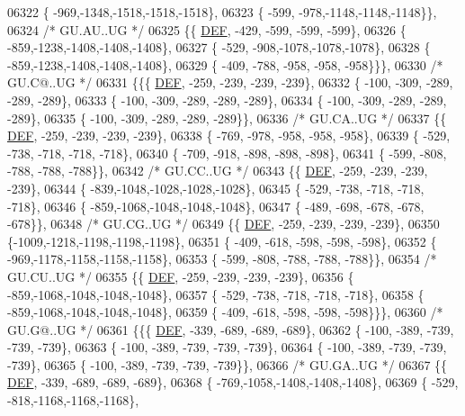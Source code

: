 \begin{DoxyCode}
06322 \{ -969,-1348,-1518,-1518,-1518\},
06323 \{ -599, -978,-1148,-1148,-1148\}\},
06324 \textcolor{comment}{/* GU.AU..UG */}
06325 \{\{  \mbox{\hyperlink{1_88_84__epars_8h_a397419fc12b37ed479c8abb9d444d843}{DEF}}, -429, -599, -599, -599\},
06326 \{ -859,-1238,-1408,-1408,-1408\},
06327 \{ -529, -908,-1078,-1078,-1078\},
06328 \{ -859,-1238,-1408,-1408,-1408\},
06329 \{ -409, -788, -958, -958, -958\}\}\},
06330 \textcolor{comment}{/* GU.C@..UG */}
06331 \{\{\{  \mbox{\hyperlink{1_88_84__epars_8h_a397419fc12b37ed479c8abb9d444d843}{DEF}}, -259, -239, -239, -239\},
06332 \{ -100, -309, -289, -289, -289\},
06333 \{ -100, -309, -289, -289, -289\},
06334 \{ -100, -309, -289, -289, -289\},
06335 \{ -100, -309, -289, -289, -289\}\},
06336 \textcolor{comment}{/* GU.CA..UG */}
06337 \{\{  \mbox{\hyperlink{1_88_84__epars_8h_a397419fc12b37ed479c8abb9d444d843}{DEF}}, -259, -239, -239, -239\},
06338 \{ -769, -978, -958, -958, -958\},
06339 \{ -529, -738, -718, -718, -718\},
06340 \{ -709, -918, -898, -898, -898\},
06341 \{ -599, -808, -788, -788, -788\}\},
06342 \textcolor{comment}{/* GU.CC..UG */}
06343 \{\{  \mbox{\hyperlink{1_88_84__epars_8h_a397419fc12b37ed479c8abb9d444d843}{DEF}}, -259, -239, -239, -239\},
06344 \{ -839,-1048,-1028,-1028,-1028\},
06345 \{ -529, -738, -718, -718, -718\},
06346 \{ -859,-1068,-1048,-1048,-1048\},
06347 \{ -489, -698, -678, -678, -678\}\},
06348 \textcolor{comment}{/* GU.CG..UG */}
06349 \{\{  \mbox{\hyperlink{1_88_84__epars_8h_a397419fc12b37ed479c8abb9d444d843}{DEF}}, -259, -239, -239, -239\},
06350 \{-1009,-1218,-1198,-1198,-1198\},
06351 \{ -409, -618, -598, -598, -598\},
06352 \{ -969,-1178,-1158,-1158,-1158\},
06353 \{ -599, -808, -788, -788, -788\}\},
06354 \textcolor{comment}{/* GU.CU..UG */}
06355 \{\{  \mbox{\hyperlink{1_88_84__epars_8h_a397419fc12b37ed479c8abb9d444d843}{DEF}}, -259, -239, -239, -239\},
06356 \{ -859,-1068,-1048,-1048,-1048\},
06357 \{ -529, -738, -718, -718, -718\},
06358 \{ -859,-1068,-1048,-1048,-1048\},
06359 \{ -409, -618, -598, -598, -598\}\}\},
06360 \textcolor{comment}{/* GU.G@..UG */}
06361 \{\{\{  \mbox{\hyperlink{1_88_84__epars_8h_a397419fc12b37ed479c8abb9d444d843}{DEF}}, -339, -689, -689, -689\},
06362 \{ -100, -389, -739, -739, -739\},
06363 \{ -100, -389, -739, -739, -739\},
06364 \{ -100, -389, -739, -739, -739\},
06365 \{ -100, -389, -739, -739, -739\}\},
06366 \textcolor{comment}{/* GU.GA..UG */}
06367 \{\{  \mbox{\hyperlink{1_88_84__epars_8h_a397419fc12b37ed479c8abb9d444d843}{DEF}}, -339, -689, -689, -689\},
06368 \{ -769,-1058,-1408,-1408,-1408\},
06369 \{ -529, -818,-1168,-1168,-1168\},

\end{DoxyCode}
